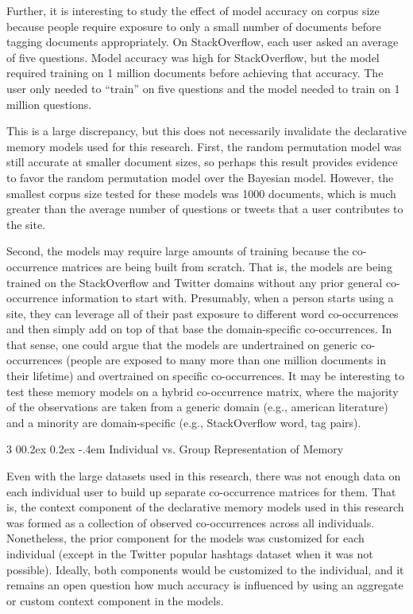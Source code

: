 \documentclass[man,floatsintext,donotrepeattitle]{apa6}
\makeatletter
\renewcommand{\subsubsection}{%
  \@startsection
  {subsubsection}%
  {3}%
  {\parindent}%
  {0\baselineskip \@plus 0.2ex \@minus 0.2ex}%
  {-.4em}%
  {\normalfont\normalsize\bfseries\addperi}}
\makeatother
\begin{document}
Further, it is interesting to study the effect of model accuracy on corpus size because people require exposure to only a small number of documents before tagging documents appropriately.
On StackOverflow, each user asked an average of five questions.
Model accuracy was high for StackOverflow, but the model required training on 1 million documents before achieving that accuracy.
The user only needed to ``train'' on five questions and the model needed to train on 1 million questions.

This is a large discrepancy, but this does not necessarily invalidate the declarative memory models used for this research.
First, the random permutation model was still accurate at smaller document sizes, so perhaps this result provides evidence to favor the random permutation model over the Bayesian model.
However, the smallest corpus size tested for these models was \num{1000} documents, which is much greater than the average number of questions or tweets that a user contributes to the site.

Second, the models may require large amounts of training because the co-occurrence matrices are being built from scratch.
That is, the models are being trained on the StackOverflow and Twitter domains without any prior general co-occurrence information to start with.
Presumably, when a person starts using a site, they can leverage all of their past exposure to different word co-occurrences and then simply add on top of that base the domain-specific co-occurrences.
In that sense, one could argue that the models are undertrained on generic co-occurrences (people are exposed to many more than one million documents in their lifetime) and overtrained on specific co-occurrences.
It may be interesting to test these memory models on a hybrid co-occurrence matrix,
where the majority of the observations are taken from a generic domain (e.g., american literature) and a minority are domain-specific (e.g., StackOverflow word, tag pairs).

\subsubsection{Individual vs. Group Representation of Memory}

Even with the large datasets used in this research, there was not enough data on each individual user to build up separate co-occurrence matrices for them.
That is, the context component of the declarative memory models used in this research was formed as a collection of observed co-occurrences across all individuals.
Nonetheless, the prior component for the models was customized for each individual (except in the Twitter popular hashtags dataset when it was not possible).
Ideally, both components would be customized to the individual, and it remains an open question how much accuracy is influenced by using an aggregate or custom context component in the models.
\end{document}
